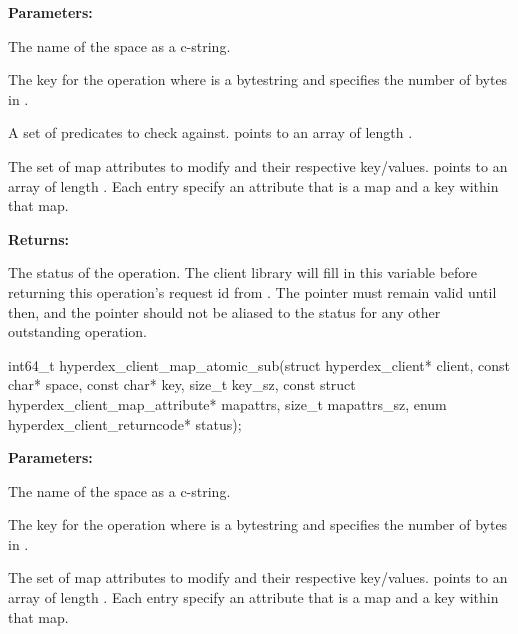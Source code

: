 \noindent\textbf{Parameters:}
\begin{description}[labelindent=\widthof{{\code{mapattrs}, \code{mapattrs\_sz}}},leftmargin=*,noitemsep,nolistsep,align=right]
\item[\code{space}] The name of the space as a c-string.
\item[\code{key}, \code{key\_sz}] The key for the operation where  is a bytestring and  specifies the number of bytes in .
\item[\code{checks}, \code{checks\_sz}] A set of predicates to check against.   points to an array of length .
\item[\code{mapattrs}, \code{mapattrs\_sz}] The set of map attributes to modify and their respective key/values.   points to an array of length .  Each entry specify an attribute that is a map and a key within that map.
\end{description}

\noindent\textbf{Returns:}
\begin{description}[labelindent=\widthof{{\code{status}}},leftmargin=*,noitemsep,nolistsep,align=right]
\item[\code{status}] The status of the operation.  The client library will fill in this variable before returning this operation's request id from .  The pointer must remain valid until then, and the pointer should not be aliased to the status for any other outstanding operation.
\end{description}

\funcsep
{}
\begin{ccode}
int64_t hyperdex_client_map_atomic_sub(struct hyperdex_client* client,
                const char* space,
                const char* key, size_t key_sz,
                const struct hyperdex_client_map_attribute* mapattrs, size_t mapattrs_sz,
                enum hyperdex_client_returncode* status);
\end{ccode}
\funcdesc 

\noindent\textbf{Parameters:}
\begin{description}[labelindent=\widthof{{\code{mapattrs}, \code{mapattrs\_sz}}},leftmargin=*,noitemsep,nolistsep,align=right]
\item[\code{space}] The name of the space as a c-string.
\item[\code{key}, \code{key\_sz}] The key for the operation where  is a bytestring and  specifies the number of bytes in .
\item[\code{mapattrs}, \code{mapattrs\_sz}] The set of map attributes to modify and their respective key/values.   points to an array of length .  Each entry specify an attribute that is a map and a key within that map.
\end{description}

